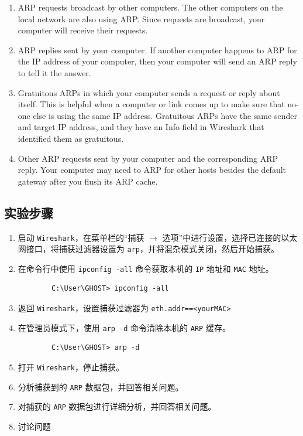 \documentclass{article}
\begin{document}
	\begin{enumerate}
		
		\item ARP requests broadcast by other computers. The other computers on the local network are also using ARP. Since requests are broadcast, your computer will receive their requests. 
		\item ARP replies sent by your computer. If another computer happens to ARP for the IP address of your computer, then your computer will send an ARP reply to tell it the answer. 
		\item Gratuitous ARPs in which your computer sends a request or reply about itself. This is helpful when a computer or link comes up to make sure that no-one else is using the same IP address. Gratuitous ARPs have the same sender and target IP address, and they have an Info field in Wireshark that identified them as gratuitous.
		\item Other ARP requests sent by your computer and the corresponding ARP reply. Your computer may need to ARP for other hosts besides the default gateway after you flush its ARP cache. 
		
	\end{enumerate}
	
	\subsection{实验步骤}
	
	\begin{enumerate}[noitemsep, label={{\arabic*})}]
		
		\item 启动 \texttt{Wireshark}，在菜单栏的“捕获 $\to$ 选项”中进行设置，选择已连接的以太网接口，将捕获过滤器设置为 \texttt{arp}，并将混杂模式关闭，然后开始捕获。
		\item 在命令行中使用 \texttt{ipconfig -all} 命令获取本机的 \texttt{IP} 地址和 \texttt{MAC} 地址。
		\begin{lstlisting}
        C:\User\GHOST> ipconfig -all
		\end{lstlisting}
		\item 返回 \texttt{Wireshark}，设置捕获过滤器为 \texttt{eth.addr==<yourMAC>}
		\item 在管理员模式下，使用 \texttt{arp -d} 命令清除本机的 \texttt{ARP} 缓存。
		\begin{lstlisting}
        C:\User\GHOST> arp -d
		\end{lstlisting}
		\item 打开 \texttt{Wireshark}，停止捕获。
		\item 分析捕获到的 \texttt{ARP} 数据包，并回答相关问题。
		\item 对捕获的 \texttt{ARP} 数据包进行详细分析，并回答相关问题。
		\item 讨论问题
	\end{enumerate}
	
\end{document}
